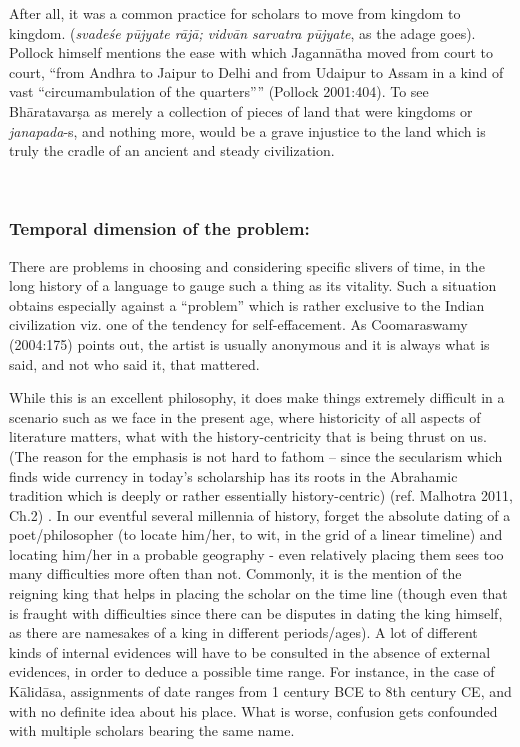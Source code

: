 After all, it was a common practice for scholars to move from kingdom to kingdom. ({\sl svadeśe pūjyate rājā; vidvān sarvatra pūjyate}, as the adage goes). Pollock himself mentions the ease with which Jagannātha moved from court to court, “from Andhra to Jaipur to Delhi and from Udaipur to Assam in a kind of vast “circumambulation of the quarters”” (Pollock 2001:404). To see Bhāratavarṣa as merely a collection of pieces of land that were kingdoms or {\sl janapada}-s, and nothing more, would be a grave injustice to the land which is truly the cradle of an ancient and steady civilization.

~\\[-40pt]

\subsubsection{Temporal dimension of the problem:}
\vskip -5pt

There are problems in choosing and considering specific slivers of time, in the long history of a language to gauge such a thing as its vitality. Such a situation obtains especially against a “problem” which is rather exclusive to the Indian civilization viz. one of the tendency for self-effacement. As Coomaraswamy (2004:175) points out, the artist is usually anonymous and it is always what is said, and not who said it, that mattered. 

While this is an excellent philosophy, it does make things extremely difficult in a scenario such as we face in the present age, where historicity of all aspects of literature matters, what with the history-centricity that is being thrust on us. (The reason for the emphasis is not hard to fathom – since the secularism which finds wide currency in today’s scholarship has its roots in the Abrahamic tradition which is deeply or rather essentially history-centric) (ref. Malhotra 2011, Ch.2) . In our eventful several millennia of history, forget the absolute dating of a poet/philosopher (to locate him/her, to wit, in the grid of a linear timeline) and locating him/her in a probable geography - even relatively placing them sees too many difficulties more often than not. Commonly, it is the mention of the reigning king that helps in placing the scholar on the time line (though even that is fraught with difficulties since there can be disputes in dating the king himself, as there are namesakes of a king in different periods/ages). A lot of different kinds of internal evidences will have to be consulted in the absence of external evidences, in order to deduce a possible time range. For instance, in the case of Kālidāsa, assignments of date ranges from 1 century BCE to 8th century CE, and  with no definite idea about his place. What is worse, confusion gets confounded with multiple scholars bearing the same name.

